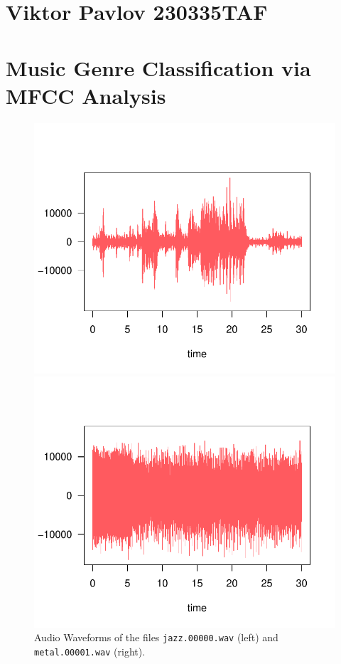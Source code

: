 \documentclass[twocolumn]{article}
\author{Name Surname }
\begin{document}
\section*{Viktor Pavlov 230335TAF}
\section{Music Genre Classification via MFCC Analysis}
\begin{figure}[htbp]
  \centering
  \begin{minipage}[t]{0.5\columnwidth}
    \centering
    \includegraphics[width=\linewidth]{images/audio_jazz.pdf}
  \end{minipage}\hfill
  \begin{minipage}[t]{0.5\columnwidth}
    \centering
    \includegraphics[width=\linewidth]{images/audio_metal.pdf}
  \end{minipage}
  \caption{Audio Waveforms of the files \texttt{jazz.00000.wav} (left) and \texttt{metal.00001.wav} (right).}
  \label{fig:waves}
\end{figure}
\end{document}
